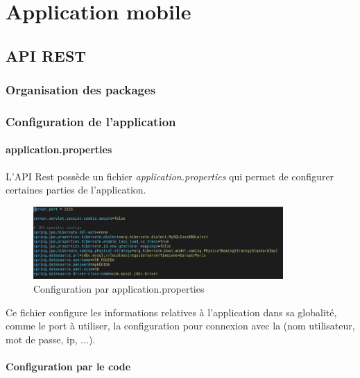 \chapter{Application mobile}

	\section{API REST}

		\subsection{Organisation des packages}


		\subsection{Configuration de l'application}

			\subsubsection{application.properties}

			L'API Rest possède un fichier \textit{application.properties} qui permet de configurer certaines parties de l'application.

			\begin{figure}[H]
				\centering\includegraphics[width=0.85\textwidth, keepaspectratio]{res/application-properties.png}
				\caption{Configuration par application.properties}
			\end{figure}

			Ce fichier configure les informations relatives à l'application dans sa globalité, comme le port à utiliser, la configuration pour connexion avec la \bdd{} (nom utilisateur, mot de passe, ip, ...).

			\subsubsection{Configuration par le code}

